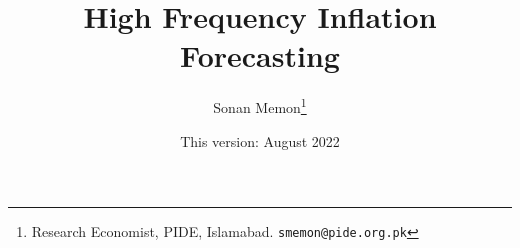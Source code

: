 \documentclass[12pt]{article}
\newcommand{\1}{\mathbbm 1}
\begin{document}
	
	
	
	
	
	
	\vspace{-0.5ex}
	
	
	
	
	
	
	
	
	\newpage{}
	
	
	
	
	
	
	\title{{High Frequency Inflation Forecasting  %
			}}
			
			
			
			\date{This version: August 2022}%
		
		
		\author{Sonan Memon\footnote{Research Economist, PIDE, Islamabad. \texttt{smemon@pide.org.pk}}}
		
		
		
		\newpage{}
		
		\maketitle
		\vspace{-2ex}
		
		
		
		
		
		
		
		
		
\end{document}
